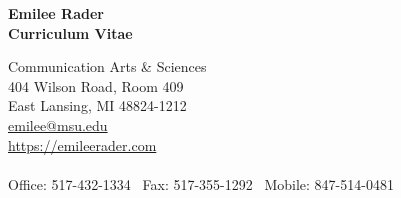 \documentclass[9pt]{extarticle}
\begin{document}
{\LARGE{\textbf{Emilee Rader}}}  \\ \vspace{3pt}
\textbf{Curriculum Vitae}


\begin{tabbing}
Communication Arts \& Sciences \hspace{1.5in}\=  \\
404 Wilson Road, Room 409 \\
East Lansing, MI 48824-1212 \\
\href{mailto:emilee@msu.edu}{emilee@msu.edu} \\
\href{https://emileerader.com/}{https://emileerader.com}  \\\\
Office: 517-432-1334  \textpipe  ~Fax: 517-355-1292  \textpipe  ~Mobile: 847-514-0481 \\\\\\
\end{tabbing}



\end{document}
